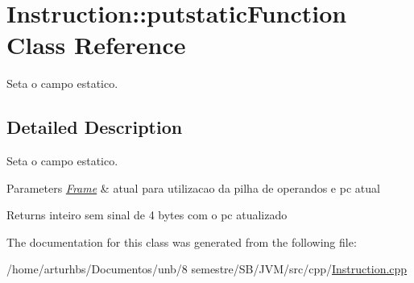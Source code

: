 \hypertarget{classInstruction_1_1putstaticFunction}{}\section{Instruction\+:\+:putstatic\+Function Class Reference}
\label{classInstruction_1_1putstaticFunction}


Seta o campo estatico.  




\subsection{Detailed Description}
Seta o campo estatico. 


\begin{DoxyParams}{Parameters}
{\em \hyperlink{classFrame}{Frame}} & atual para utilizacao da pilha de operandos e pc atual \\
\hline
\end{DoxyParams}
\begin{DoxyReturn}{Returns}
inteiro sem sinal de 4 bytes com o pc atualizado 
\end{DoxyReturn}


The documentation for this class was generated from the following file\+:\begin{DoxyCompactItemize}
\item 
/home/arturhbs/\+Documentos/unb/8 semestre/\+S\+B/\+J\+V\+M/src/cpp/\hyperlink{Instruction_8cpp}{Instruction.\+cpp}\end{DoxyCompactItemize}
